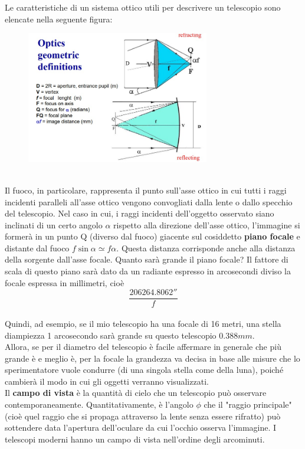 \documentclass[a4paper,11pt]{article}
\begin{document}
Le caratteristiche di un sistema ottico utili per descrivere un telescopio sono elencate nella seguente figura:
 \begin{figure}[h!!]
    \centering
    \includegraphics[width=8cm]{WhatsApp Image 2023-01-09 at 02.46.32.jpeg}
    \label{fig:my_label6}
\end{figure}\\
Il fuoco, in particolare, rappresenta il punto sull'asse ottico in cui tutti i raggi incidenti paralleli all'asse ottico vengono convogliati dalla lente o dallo specchio del telescopio. Nel caso in cui, i raggi incidenti dell'oggetto  osservato siano inclinati di un certo angolo \(\alpha\) rispetto alla direzione dell'asse ottico, l'immagine si formerà in un punto Q (diverso dal fuoco) giacente sul cosiddetto \textbf{piano focale} e distante dal fuoco \(f\sin{\alpha} \simeq f\alpha\). Questa distanza corrisponde anche alla distanza della sorgente dall'asse focale.
Quanto sarà grande il piano focale? Il fattore di scala di questo piano sarà dato da un radiante espresso in arcosecondi diviso la focale espressa in millimetri, cioè 
\begin{equation*}
    \frac{206264.8062''}{f}
\end{equation*}\\
Quindi, ad esempio, se il mio telescopio ha una focale di 16 metri, una stella diampiezza 1 arcosecondo sarà grande su questo telescopio \(0.388 mm\).\\
Allora, se per il diametro del telescopio è facile affermare in generale che più grande è e meglio è, per la focale la grandezza va decisa in base alle misure che lo sperimentatore vuole condurre (di una singola stella come della luna), poiché cambierà il modo in cui gli oggetti verranno visualizzati.\\
Il \textbf{campo di vista} è la quantità di cielo che un telescopio può osservare contemporaneamente. Quantitativamente, è l'angolo \(\phi\) che il "raggio principale" (cioè quel raggio che si propaga attraverso la lente senza essere rifratto) può sottendere data l'apertura dell'oculare da cui l'occhio osserva l'immagine. I telescopi moderni hanno un campo di vista nell'ordine degli arcominuti. 
\end{document}
